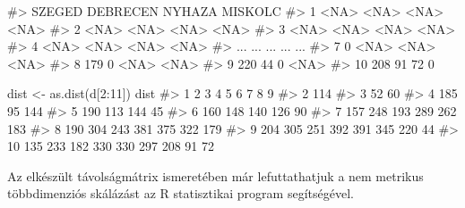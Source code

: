 \documentclass[
  letterpaper,
]{krantz}
\makeatletter
\newenvironment{Shaded}{\begin{snugshade}}{\end{snugshade}}
\newcommand{\CommentTok}[1]{\textcolor[rgb]{0.37,0.37,0.37}{#1}}
\newcommand{\DecValTok}[1]{\textcolor[rgb]{0.68,0.00,0.00}{#1}}
\newcommand{\FunctionTok}[1]{\textcolor[rgb]{0.28,0.35,0.67}{#1}}
\newcommand{\NormalTok}[1]{\textcolor[rgb]{0.00,0.23,0.31}{#1}}
\newcommand{\OtherTok}[1]{\textcolor[rgb]{0.00,0.23,0.31}{#1}}
\newcommand{\SpecialCharTok}[1]{\textcolor[rgb]{0.37,0.37,0.37}{#1}}
\newenvironment{kframe}{%
\medskip{}
\setlength{\fboxsep}{.8em}
 \def\at@end@of@kframe{}%
 \ifinner\ifhmode%
  \def\at@end@of@kframe{\end{minipage}}%
  \begin{minipage}{\columnwidth}%
 \fi\fi%
 \def\FrameCommand##1{\hskip\@totalleftmargin \hskip-\fboxsep
 \colorbox{shadecolor}{##1}\hskip-\fboxsep
     \hskip-\linewidth \hskip-\@totalleftmargin \hskip\columnwidth}%
 \MakeFramed {\advance\hsize-\width
   \@totalleftmargin\z@ \linewidth\hsize
   \@setminipage}}%
 {\par\unskip\endMakeFramed%
 \at@end@of@kframe}
\renewenvironment{Shaded}{\begin{kframe}}{\end{kframe}}
\makeatother
\begin{document}
\begin{Shaded}
\begin{Highlighting}[]
\CommentTok{\#\textgreater{}     SZEGED DEBRECEN NYHAZA MISKOLC}
\CommentTok{\#\textgreater{} 1     \textless{}NA\textgreater{}     \textless{}NA\textgreater{}   \textless{}NA\textgreater{}    \textless{}NA\textgreater{}}
\CommentTok{\#\textgreater{} 2     \textless{}NA\textgreater{}     \textless{}NA\textgreater{}   \textless{}NA\textgreater{}    \textless{}NA\textgreater{}}
\CommentTok{\#\textgreater{} 3     \textless{}NA\textgreater{}     \textless{}NA\textgreater{}   \textless{}NA\textgreater{}    \textless{}NA\textgreater{}}
\CommentTok{\#\textgreater{} 4     \textless{}NA\textgreater{}     \textless{}NA\textgreater{}   \textless{}NA\textgreater{}    \textless{}NA\textgreater{}}
\CommentTok{\#\textgreater{} ...    ...      ...    ...     ...}
\CommentTok{\#\textgreater{} 7        0     \textless{}NA\textgreater{}   \textless{}NA\textgreater{}    \textless{}NA\textgreater{}}
\CommentTok{\#\textgreater{} 8      179        0   \textless{}NA\textgreater{}    \textless{}NA\textgreater{}}
\CommentTok{\#\textgreater{} 9      220       44      0    \textless{}NA\textgreater{}}
\CommentTok{\#\textgreater{} 10     208       91     72       0}
\end{Highlighting}
\end{Shaded}

\begin{Shaded}
\begin{Highlighting}[]
\NormalTok{dist }\OtherTok{\textless{}{-}} \FunctionTok{as.dist}\NormalTok{(d[}\DecValTok{2}\SpecialCharTok{:}\DecValTok{11}\NormalTok{])}
\NormalTok{dist}
\CommentTok{\#\textgreater{}      1   2   3   4   5   6   7   8   9}
\CommentTok{\#\textgreater{} 2  114                                }
\CommentTok{\#\textgreater{} 3   52  60                            }
\CommentTok{\#\textgreater{} 4  185  95 144                        }
\CommentTok{\#\textgreater{} 5  190 113 144  45                    }
\CommentTok{\#\textgreater{} 6  160 148 140 126  90                }
\CommentTok{\#\textgreater{} 7  157 248 193 289 262 183            }
\CommentTok{\#\textgreater{} 8  190 304 243 381 375 322 179        }
\CommentTok{\#\textgreater{} 9  204 305 251 392 391 345 220  44    }
\CommentTok{\#\textgreater{} 10 135 233 182 330 330 297 208  91  72}
\end{Highlighting}
\end{Shaded}

Az elkészült távolságmátrix ismeretében már lefuttathatjuk a nem
metrikus többdimenziós skálázást az R statisztikai program segítségével.
\end{document}
